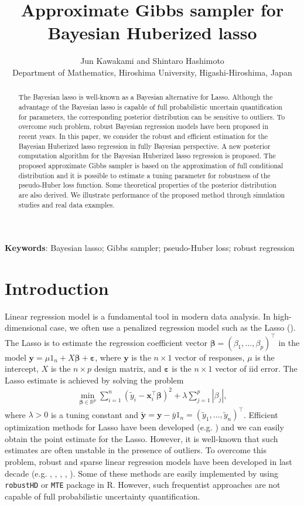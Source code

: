\documentclass[11pt]{article}
\title{Approximate Gibbs sampler for Bayesian Huberized lasso
}
\author{Jun Kawakami and Shintaro Hashimoto\\
Department of Mathematics, Hiroshima University, Higashi-Hiroshima, Japan}
\theoremstyle{plain}
\theoremstyle{definition}
\begin{document}
\date{}

\maketitle

\begin{abstract}
The Bayesian lasso is well-known as a Bayesian alternative for Lasso. Although the advantage of the Bayesian lasso is capable of full  probabilistic uncertain quantification for parameters, the corresponding posterior distribution can be sensitive to outliers. To overcome such problem, robust Bayesian regression models have been proposed in recent years. 
In this paper, we consider the robust and efficient estimation for the Bayesian Huberized lasso regression in fully Bayesian perspective. 
A new posterior computation algorithm for the Bayesian Huberized lasso regression is proposed. The proposed approximate Gibbs sampler is based on the approximation of full conditional distribution and it is possible to estimate a tuning parameter for robustness of the pseudo-Huber loss function. Some theoretical properties of the posterior distribution are also derived. We illustrate performance of the proposed method through simulation studies and real data examples.
\end{abstract}

\noindent
{\bf Keywords}: Bayesian lasso; Gibbs sampler; pseudo-Huber loss; robust regression
\medskip


\section{Introduction}

Linear regression model is a fundamental tool in modern data analysis. In high-dimensional case, we often use a penalized regression model such as the Lasso (\cite{T96}). The Lasso is to estimate the regression coefficient vector $\bm{\beta}=(\beta_1,\dots,\beta_p)^{\top}$ in the model $\bm{y}=\mu 1_n +X\bm{\beta} +\bm{\varepsilon}$, where $\bm{y}$ is the $n\times 1$ vector of responses, $\mu$ is the intercept, $X$ is the $n\times p$ design matrix, and $\bm{\varepsilon}$ is the $n\times 1$ vector of iid error. The Lasso estimate is achieved by solving the problem
\begin{align}\label{lasso}
\min_{\bm{\beta} \in \mathbb{R}^p} \sum_{i=1}^n (\tilde{y}_i-\bm{x}_i^{\top} \bm{\beta})^2+\lambda \sum_{j=1}^p |\beta_j|,
\end{align}
where $\lambda>0$ is a tuning constant and $\tilde{\bm{y}}=\bm{y}-\bar{y}1_n=(\tilde{y}_1,\dots,\tilde{y}_n)^{\top}$. Efficient optimization methods for Lasso have been developed (e.g. \cite{EHJT04}) and we can easily obtain the point estimate for the Lasso. However, it is well-known that such estimates are often unstable in the presence of outliers. To overcome this problem, robust and sparse linear regression models have been developed in last decade (e.g. \cite{KAZ07}, \cite{WLJ07}, \cite{LZ11}, \cite{ACG13}, \cite{KF17}). Some of these methods are easily implemented by using {\tt robustHD} or {\tt MTE} package in R. However, such frequentist approaches are not capable of full probabilistic uncertainty quantification.
\end{document}
